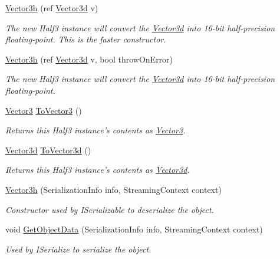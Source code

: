 \begin{DoxyCompactItemize}
\hyperlink{struct_open_t_k_1_1_vector3h_a1192138254203e1164cc9d84ec0b4ba9}{Vector3h} (ref \hyperlink{struct_open_t_k_1_1_vector3d}{Vector3d} v)
\begin{DoxyCompactList}\small\item\em The new Half3 instance will convert the \hyperlink{struct_open_t_k_1_1_vector3d}{Vector3d} into 16-\/bit half-\/precision floating-\/point. This is the faster constructor. \end{DoxyCompactList}\item 
\hyperlink{struct_open_t_k_1_1_vector3h_ae4559fb485c107b1f909d658cabd4b8e}{Vector3h} (ref \hyperlink{struct_open_t_k_1_1_vector3d}{Vector3d} v, bool throw\-On\-Error)
\begin{DoxyCompactList}\small\item\em The new Half3 instance will convert the \hyperlink{struct_open_t_k_1_1_vector3d}{Vector3d} into 16-\/bit half-\/precision floating-\/point. \end{DoxyCompactList}\item 
\hyperlink{struct_open_t_k_1_1_vector3}{Vector3} \hyperlink{struct_open_t_k_1_1_vector3h_a8e16a499d853697ff0e15b5ef1fe8cce}{To\-Vector3} ()
\begin{DoxyCompactList}\small\item\em Returns this Half3 instance's contents as \hyperlink{struct_open_t_k_1_1_vector3}{Vector3}. \end{DoxyCompactList}\item 
\hyperlink{struct_open_t_k_1_1_vector3d}{Vector3d} \hyperlink{struct_open_t_k_1_1_vector3h_aa0d61f4d1b26bbc9cd7ae36db7e83f2a}{To\-Vector3d} ()
\begin{DoxyCompactList}\small\item\em Returns this Half3 instance's contents as \hyperlink{struct_open_t_k_1_1_vector3d}{Vector3d}. \end{DoxyCompactList}\item 
\hyperlink{struct_open_t_k_1_1_vector3h_ad9a342fee8c4bb7b1198cc770b8eba51}{Vector3h} (Serialization\-Info info, Streaming\-Context context)
\begin{DoxyCompactList}\small\item\em Constructor used by I\-Serializable to deserialize the object.\end{DoxyCompactList}\item 
void \hyperlink{struct_open_t_k_1_1_vector3h_a10a72a8f7b73486e572ba689e1f17f4b}{Get\-Object\-Data} (Serialization\-Info info, Streaming\-Context context)
\begin{DoxyCompactList}\small\item\em Used by I\-Serialize to serialize the object.\end{DoxyCompactList}\item 

\end{DoxyCompactItemize}
